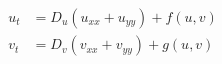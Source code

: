 \begin{eqnarray}
u_t &= D_u (u_{xx} + u_{yy}) + f(u,v)  \\
v_t &= D_v (v_{xx} + v_{yy}) + g(u,v) 
\end{eqnarray}








